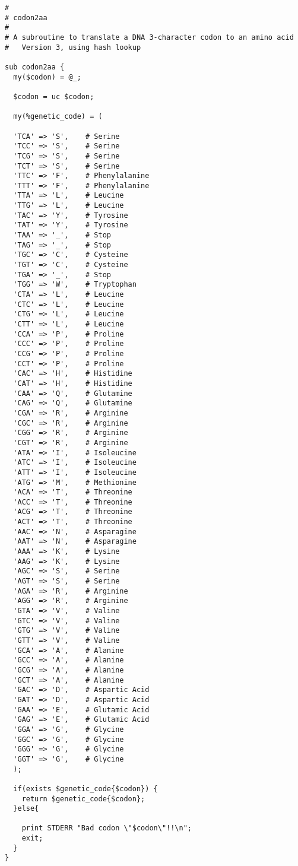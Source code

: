\begin{lstlisting}
#
# codon2aa
#
# A subroutine to translate a DNA 3-character codon to an amino acid
#   Version 3, using hash lookup

sub codon2aa {
  my($codon) = @_;

  $codon = uc $codon;
 
  my(%genetic_code) = (
  
  'TCA' => 'S',    # Serine
  'TCC' => 'S',    # Serine
  'TCG' => 'S',    # Serine
  'TCT' => 'S',    # Serine
  'TTC' => 'F',    # Phenylalanine
  'TTT' => 'F',    # Phenylalanine
  'TTA' => 'L',    # Leucine
  'TTG' => 'L',    # Leucine
  'TAC' => 'Y',    # Tyrosine
  'TAT' => 'Y',    # Tyrosine
  'TAA' => '_',    # Stop
  'TAG' => '_',    # Stop
  'TGC' => 'C',    # Cysteine
  'TGT' => 'C',    # Cysteine
  'TGA' => '_',    # Stop
  'TGG' => 'W',    # Tryptophan
  'CTA' => 'L',    # Leucine
  'CTC' => 'L',    # Leucine
  'CTG' => 'L',    # Leucine
  'CTT' => 'L',    # Leucine
  'CCA' => 'P',    # Proline
  'CCC' => 'P',    # Proline
  'CCG' => 'P',    # Proline
  'CCT' => 'P',    # Proline
  'CAC' => 'H',    # Histidine
  'CAT' => 'H',    # Histidine
  'CAA' => 'Q',    # Glutamine
  'CAG' => 'Q',    # Glutamine
  'CGA' => 'R',    # Arginine
  'CGC' => 'R',    # Arginine
  'CGG' => 'R',    # Arginine
  'CGT' => 'R',    # Arginine
  'ATA' => 'I',    # Isoleucine
  'ATC' => 'I',    # Isoleucine
  'ATT' => 'I',    # Isoleucine
  'ATG' => 'M',    # Methionine
  'ACA' => 'T',    # Threonine
  'ACC' => 'T',    # Threonine
  'ACG' => 'T',    # Threonine
  'ACT' => 'T',    # Threonine
  'AAC' => 'N',    # Asparagine
  'AAT' => 'N',    # Asparagine
  'AAA' => 'K',    # Lysine
  'AAG' => 'K',    # Lysine
  'AGC' => 'S',    # Serine
  'AGT' => 'S',    # Serine
  'AGA' => 'R',    # Arginine
  'AGG' => 'R',    # Arginine
  'GTA' => 'V',    # Valine
  'GTC' => 'V',    # Valine
  'GTG' => 'V',    # Valine
  'GTT' => 'V',    # Valine
  'GCA' => 'A',    # Alanine
  'GCC' => 'A',    # Alanine
  'GCG' => 'A',    # Alanine
  'GCT' => 'A',    # Alanine
  'GAC' => 'D',    # Aspartic Acid
  'GAT' => 'D',    # Aspartic Acid
  'GAA' => 'E',    # Glutamic Acid
  'GAG' => 'E',    # Glutamic Acid
  'GGA' => 'G',    # Glycine
  'GGC' => 'G',    # Glycine
  'GGG' => 'G',    # Glycine
  'GGT' => 'G',    # Glycine
  );

  if(exists $genetic_code{$codon}) {
    return $genetic_code{$codon};
  }else{

    print STDERR "Bad codon \"$codon\"!!\n";
    exit;
  }
}
\end{lstlisting}

